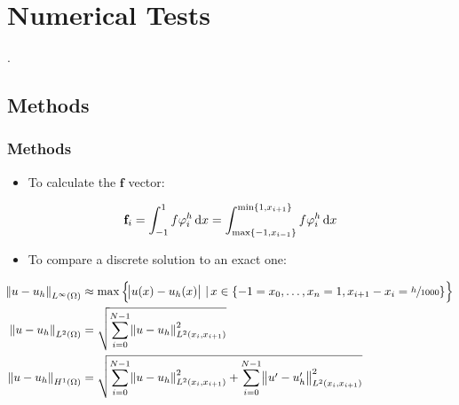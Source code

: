 \section{Numerical Tests}
\PraesentationMasterWeissBlau
\begin{frame}
	\centering
	\vspace{6cm}
	\huge{\thesection . \secname}
\end{frame}
\PraesentationMasterStandard

\subsection{Methods}
\begin{frame}
	\frametitle{Methods}
	\begin{itemize}
		\item To calculate the $\mathbf{f}$ vector:
	\end{itemize}
	\begin{equation}
		\mathbf{f}_i = \int_{-1}^1 f\varphi_i^h\dif x = \int_{\max\{-1, x_{i-1}\}}^{\min\{1, x_{i+1}\}} f\varphi_i^h\dif x
	\end{equation} 
\vspace{-1cm}
	\begin{itemize}
		\item To compare a discrete solution to an exact one:
	\end{itemize}
	\begin{align}
		\norm{u-u_h}_{L^\infty(\Omega)} &\approx \max \left\{\abs{u(x) - u_h(x)} \,|\, x \in \{-1 = x_0,\dots, x_n = 1, x_{i+1} - x_i = \sfrac{h}{1000}\} \right\} \\
		\norm{u-u_h}_{L^2(\Omega)} &= \sqrt{\sum_{i=0}^{N-1} \norm{u-u_h}_{L^2(x_i, x_{i+1})}^2 } \\
		\norm{u-u_h}_{H^1(\Omega)} &= \sqrt{\sum_{i=0}^{N-1} \norm{u-u_h}_{L^2(x_i, x_{i+1})}^2 + \sum_{i=0}^{N-1} \norm{u'-u_h'}_{L^2(x_i, x_{i+1})}^2} 
	\end{align}
\end{frame}	
	
